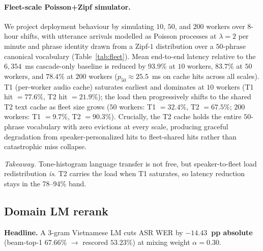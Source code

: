 \documentclass[a4paper,fleqn]{cas-dc}
\begin{document}
\paragraph{Fleet-scale Poisson+Zipf simulator.} We project deployment behaviour by simulating $10$, $50$, and $200$ workers over $8$-hour shifts, with utterance arrivals modelled as Poisson processes at $\lambda = 2$ per minute and phrase identity drawn from a Zipf-$1$ distribution over a $50$-phrase canonical vocabulary (Table~\ref{tab:fleet}). Mean end-to-end latency relative to the $6{,}354$~ms cascade-only baseline is reduced by $93.9\%$ at $10$ workers, $83.7\%$ at $50$ workers, and $78.4\%$ at $200$ workers ($p_{50} \approx 25.5$~ms on cache hits across all scales). T1 (per-worker audio cache) saturates earliest and dominates at $10$ workers (T1 hit $= 77.6\%$, T2 hit $= 21.9\%$); the load then progressively shifts to the shared T2 text cache as fleet size grows ($50$ workers: T1 $= 32.4\%$, T2 $= 67.5\%$; $200$ workers: T1 $= 9.7\%$, T2 $= 90.3\%$). Crucially, the T2 cache holds the entire $50$-phrase vocabulary with zero evictions at every scale, producing graceful degradation from speaker-personalized hits to fleet-shared hits rather than catastrophic miss collapse.

\noindent\textit{Takeaway.} Tone-histogram language transfer is not free, but speaker-to-fleet load redistribution \emph{is}. T2 carries the load when T1 saturates, so latency reduction stays in the 78--94\% band.

\subsection{Domain LM rerank}\label{sec:exp:lmrerank}
\textbf{Headline.} A $3$-gram Vietnamese LM cuts ASR WER by \textbf{$-14.43$~pp absolute} (beam-top-1 $67.66\%$ $\rightarrow$ rescored $53.23\%$) at mixing weight $\alpha=0.30$.
\end{document}
